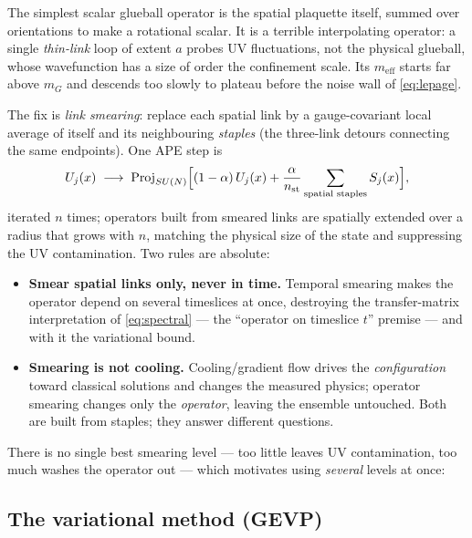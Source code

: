 \documentclass[11pt,a4paper]{article}
\newcommand{\meff}{m_{\mathrm{eff}}}
\begin{document}
The simplest scalar glueball operator is the spatial plaquette itself, summed
over orientations to make a rotational scalar. It is a terrible interpolating
operator: a single \emph{thin-link} loop of extent $a$ probes UV fluctuations,
not the physical glueball, whose wavefunction has a size of order the
confinement scale. Its $\meff$ starts far above $m_G$ and descends too slowly
to plateau before the noise wall of \eqref{eq:lepage}.

The fix is \emph{link smearing}: replace each spatial link by a
gauge-covariant local average of itself and its neighbouring
\emph{staples} (the three-link detours connecting the same endpoints). One
APE step \cite{APE1987} is
\begin{equation}
  U_j(x)\;\longrightarrow\;
  \mathrm{Proj}_{SU(N)}\Big[
    (1-\alpha)\, U_j(x)
    + \frac{\alpha}{n_{\rm st}} \sum_{\text{spatial staples}} S_j(x)
  \Big],
  \label{eq:ape}
\end{equation}
iterated $n$ times; operators built from smeared links are spatially extended
over a radius that grows with $n$, matching the physical size of the state and
suppressing the UV contamination. Two rules are absolute:
\begin{itemize}
  \item \textbf{Smear spatial links only, never in time.} Temporal smearing
  makes the operator depend on several timeslices at once, destroying the
  transfer-matrix interpretation of \eqref{eq:spectral} --- the ``operator on
  timeslice $t$'' premise --- and with it the variational bound.
  \item \textbf{Smearing is not cooling.} Cooling/gradient flow drives the
  \emph{configuration} toward classical solutions and changes the measured
  physics; operator smearing changes only the \emph{operator}, leaving the
  ensemble untouched. Both are built from staples; they answer different
  questions.
\end{itemize}
There is no single best smearing level --- too little leaves UV
contamination, too much washes the operator out --- which motivates using
\emph{several} levels at once:

\subsection{The variational method (GEVP)}
\label{sec:gevp}
\end{document}
